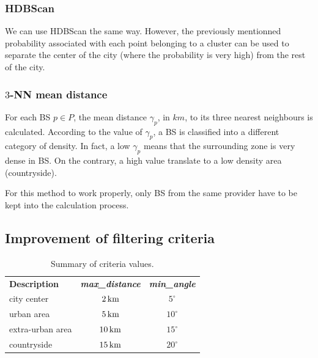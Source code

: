\documentclass[lettersize,journal,english]{IEEEtran}
\begin{document}
        \subsubsection{HDBScan}
            We can use HDBScan the same way. However, the previously mentionned probability associated with each point belonging to a cluster can be used to separate the center of the city (where the probability is very high) from the rest of the city.

        \subsubsection{$3$-NN mean distance}
            For each BS $p\in P$, the mean distance $\gamma_p$, in $\unit{km}$, to its three nearest neighbours is calculated. According to the value of $\gamma_p$, a BS is classified into a different category of density. In fact, a low $\gamma_p$ means that the surrounding zone is very dense in BS. On the contrary, a high value translate to a low density area (countryside).

            For this method to work properly, only BS from the same provider have to be kept into the calculation process.


    \subsection{Improvement of filtering criteria}
        \begin{table}
            \centering
            \caption{Summary of criteria values.}
            \label{table:crit_summary}
            \begin{tabular}{lcc}
                \toprule
                \textbf{Description} & \textbf{\emph{max\_distance}} & \textbf{\emph{min\_angle}} \\
                \cmidrule(lr){1-3}
                city center & $\unit[2]{km}$ & $5^\circ$ \\
                urban area & $\unit[5]{km}$ & $10^\circ$ \\
                extra-urban area & $\unit[10]{km}$ & $15^\circ$ \\
                countryside & $\unit[15]{km}$ & $20^\circ$ \\
                \bottomrule
            \end{tabular}
        \end{table}
\end{document}
